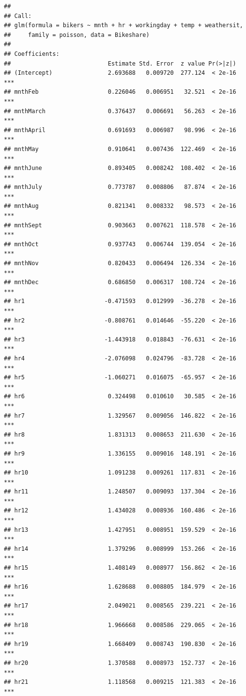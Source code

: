 \documentclass[
  11pt,
]{article}
\begin{document}
\begin{verbatim}
## 
## Call:
## glm(formula = bikers ~ mnth + hr + workingday + temp + weathersit, 
##     family = poisson, data = Bikeshare)
## 
## Coefficients:
##                            Estimate Std. Error  z value Pr(>|z|)    
## (Intercept)                2.693688   0.009720  277.124  < 2e-16 ***
## mnthFeb                    0.226046   0.006951   32.521  < 2e-16 ***
## mnthMarch                  0.376437   0.006691   56.263  < 2e-16 ***
## mnthApril                  0.691693   0.006987   98.996  < 2e-16 ***
## mnthMay                    0.910641   0.007436  122.469  < 2e-16 ***
## mnthJune                   0.893405   0.008242  108.402  < 2e-16 ***
## mnthJuly                   0.773787   0.008806   87.874  < 2e-16 ***
## mnthAug                    0.821341   0.008332   98.573  < 2e-16 ***
## mnthSept                   0.903663   0.007621  118.578  < 2e-16 ***
## mnthOct                    0.937743   0.006744  139.054  < 2e-16 ***
## mnthNov                    0.820433   0.006494  126.334  < 2e-16 ***
## mnthDec                    0.686850   0.006317  108.724  < 2e-16 ***
## hr1                       -0.471593   0.012999  -36.278  < 2e-16 ***
## hr2                       -0.808761   0.014646  -55.220  < 2e-16 ***
## hr3                       -1.443918   0.018843  -76.631  < 2e-16 ***
## hr4                       -2.076098   0.024796  -83.728  < 2e-16 ***
## hr5                       -1.060271   0.016075  -65.957  < 2e-16 ***
## hr6                        0.324498   0.010610   30.585  < 2e-16 ***
## hr7                        1.329567   0.009056  146.822  < 2e-16 ***
## hr8                        1.831313   0.008653  211.630  < 2e-16 ***
## hr9                        1.336155   0.009016  148.191  < 2e-16 ***
## hr10                       1.091238   0.009261  117.831  < 2e-16 ***
## hr11                       1.248507   0.009093  137.304  < 2e-16 ***
## hr12                       1.434028   0.008936  160.486  < 2e-16 ***
## hr13                       1.427951   0.008951  159.529  < 2e-16 ***
## hr14                       1.379296   0.008999  153.266  < 2e-16 ***
## hr15                       1.408149   0.008977  156.862  < 2e-16 ***
## hr16                       1.628688   0.008805  184.979  < 2e-16 ***
## hr17                       2.049021   0.008565  239.221  < 2e-16 ***
## hr18                       1.966668   0.008586  229.065  < 2e-16 ***
## hr19                       1.668409   0.008743  190.830  < 2e-16 ***
## hr20                       1.370588   0.008973  152.737  < 2e-16 ***
## hr21                       1.118568   0.009215  121.383  < 2e-16 ***

\end{verbatim}
\end{document}

